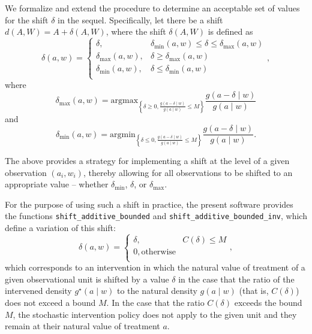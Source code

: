 \documentclass[12pt, krantz2,]{book}
\theoremstyle{definition}
\theoremstyle{definition}
\theoremstyle{definition}
\newcommand{\1}{\mathbbm{1}}
\begin{document}
We formalize and extend the procedure to determine an acceptable set of values
for the shift \(\delta\) in the sequel. Specifically, let there be a shift \(d(A, W) = A + \delta(A, W)\), where the shift \(\delta(A, W)\) is defined as
\begin{equation}
  \delta(a, w) =
    \begin{cases}
      \delta, & \delta_{\text{min}}(a,w) \leq \delta \leq
        \delta_{\text{max}}(a,w) \\
      \delta_{\text{max}}(a,w), & \delta \geq \delta_{\text{max}}(a,w) \\
      \delta_{\text{min}}(a,w), & \delta \leq \delta_{\text{min}}(a,w) \\
    \end{cases},
\end{equation}
where \[\delta_{\text{max}}(a, w) = \text{argmax}_{\left\{\delta \geq 0,
\frac{g(a - \delta \mid w)}{g(a \mid w)} \leq M \right\}} \frac{g(a - \delta
\mid w)}{g(a \mid w)}\] and
\[\delta_{\text{min}}(a, w) = \text{argmin}_{\left\{\delta \leq 0,
\frac{g(a - \delta \mid w)}{g(a \mid w)} \leq M \right\}} \frac{g(a - \delta
\mid w)}{g(a \mid w)}.\]

The above provides a strategy for implementing a shift at the level of a given
observation \((a_i, w_i)\), thereby allowing for all observations to be shifted
to an appropriate value -- whether \(\delta_{\text{min}}\), \(\delta\), or
\(\delta_{\text{max}}\).

For the purpose of using such a shift in practice, the present software
provides the functions \texttt{shift\_additive\_bounded} and
\texttt{shift\_additive\_bounded\_inv}, which define a variation of this shift:
\begin{equation}
  \delta(a, w) =
    \begin{cases}
      \delta, & C(\delta) \leq M \\
      0, \text{otherwise} \\
    \end{cases},
  \label{eq:shift-simple}
\end{equation}
which corresponds to an intervention in which the natural value of treatment
of a given observational unit is shifted by a value \(\delta\) in the case that
the ratio of the intervened density \(g^{\star}(a \mid w)\) to the natural
density \(g(a \mid w)\) (that is, \(C(\delta)\)) does not exceed a bound \(M\). In
the case that the ratio \(C(\delta)\) exceeds the bound \(M\), the stochastic
intervention policy does not apply to the given unit and they remain at their
natural value of treatment \(a\).
\end{document}
